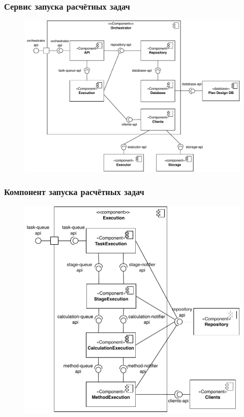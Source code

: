 \begin{frame}
\frametitle{Сервис запуска расчётных задач}
\begin{figure}
    \includegraphics[scale=.5]{pictures/architecture/orchestrator_component_common}
\end{figure}
\end{frame}

\begin{frame}
\frametitle{Компонент запуска расчётных задач}
\begin{figure}
    \includegraphics[scale=.5]{pictures/architecture/orchestrator_component_detailed}
\end{figure}
\end{frame}


